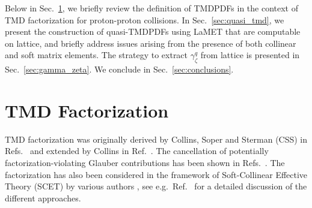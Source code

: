 \documentclass[prd,aps,twocolumn,bibnotes,nofootinbib,preprintnumbers,floatfix]{revtex4-1}
\DeclareRobustCommand{\sec}[1]{Sec.~\ref{sec:#1}}
\DeclareRobustCommand{\mycite}[1]{Ref.~\cite{#1}}
\DeclareRobustCommand{\mycites}[1]{Refs.~\cite{#1}}
\begin{document}
Below in \sec{tmd_review}, we briefly review the definition of TMDPDFs in the context of TMD factorization for proton-proton collisions.
In \sec{quasi_tmd}, we present the construction of quasi-TMDPDFs using LaMET that are computable on lattice, and briefly address issues arising from the presence of both collinear and soft matrix elements.
The strategy to extract $\gamma_\zeta^q$ from lattice is presented in \sec{gamma_zeta}.
We conclude in \sec{conclusions}.

\section{TMD Factorization}
\label{sec:tmd_review}

TMD factorization was originally derived by Collins, Soper and Sterman (CSS)
in \mycites{Collins:1981uk,Collins:1981va,Collins:1984kg} and extended by Collins in \mycite{Collins:1350496}.
The cancellation of potentially factorization-violating Glauber contributions has been shown in
\mycites{Collins:1985ue,Collins:1988ig,Collins:1989gx,Collins:1350496,Diehl:2015bca}.
The factorization has also been considered in the framework of Soft-Collinear Effective Theory (SCET)
\cite{Bauer:2000ew, Bauer:2000yr, Bauer:2001ct, Bauer:2001yt}
by various authors \cite{Becher:2010tm, Becher:2011xn, Becher:2012yn, GarciaEchevarria:2011rb, Echevarria:2012js, Echevarria:2014rua, Chiu:2012ir},
see e.g.\ \mycite{Collins:2017oxh} for a detailed discussion of the different approaches.
\end{document}
